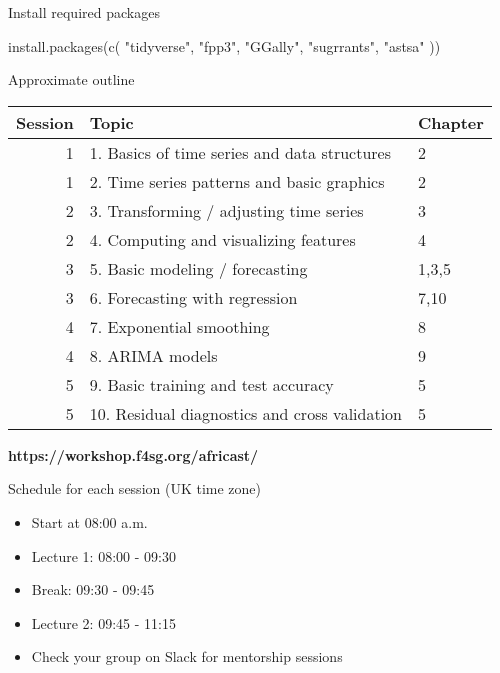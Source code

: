 \documentclass[
  14pt,
  ignorenonframetext,
  aspectratio=169,
]{beamer}
\newenvironment{Shaded}{\begin{snugshade}}{\end{snugshade}}
\newcommand{\FunctionTok}[1]{\textcolor[rgb]{0.00,0.00,0.00}{#1}}
\newcommand{\NormalTok}[1]{\textcolor[rgb]{0.00,0.00,0.00}{#1}}
\newcommand{\StringTok}[1]{\textcolor[rgb]{0.31,0.60,0.02}{#1}}
\providecommand{\tightlist}{%
  \setlength{\itemsep}{0pt}\setlength{\parskip}{0pt}}\usepackage{longtable,booktabs,array}
\renewenvironment{Shaded}{\vspace*{0.15cm}\color{black}\fontsize{10}{10}\sf\begin{snugshade}\color{black}}{\end{snugshade}}
\begin{document}
\begin{frame}[fragile]{Install required packages}
\protect\hypertarget{install-required-packages}{}
\begin{Shaded}
\begin{Highlighting}[]
\FunctionTok{install.packages}\NormalTok{(}\FunctionTok{c}\NormalTok{(}
  \StringTok{"tidyverse"}\NormalTok{,}
  \StringTok{"fpp3"}\NormalTok{,}
  \StringTok{"GGally"}\NormalTok{,}
  \StringTok{"sugrrants"}\NormalTok{,}
  \StringTok{"astsa"}
\NormalTok{))}
\end{Highlighting}
\end{Shaded}
\end{frame}

\begin{frame}{Approximate outline}
\protect\hypertarget{approximate-outline}{}
\vspace*{-0.1cm}\centering\fontsize{12}{12}\sf
\begin{tabular}{rp{8.6cm}l}
  \bf Session & \bf Topic                   & \bf Chapter \\
  \midrule
  1       & 1. Basics of time series and data structures    & 2 \\
  1       & 2. Time series patterns and basic graphics      & 2 \\
  2       & 3. Transforming / adjusting time series         & 3 \\
  2       & 4. Computing and visualizing features     & 4 \\
  3       & 5. Basic modeling / forecasting & 1,3,5 \\
  3       & 6. Forecasting with regression         & 7,10 \\
  4       & 7. Exponential smoothing       & 8 \\
  4       & 8. ARIMA models                & 9 \\
  5       & 9. Basic training and test accuracy       & 5 \\
  5       & 10. Residual diagnostics and cross validation                & 5 \\
  \bottomrule
\end{tabular}

\vspace*{.0cm}\begin{alertblock}{}{\centerline{\Large\textbf{https://workshop.f4sg.org/africast/}}}
\end{alertblock}
\end{frame}

\begin{frame}{Schedule for each session (UK time zone)}
\protect\hypertarget{schedule-for-each-session-uk-time-zone}{}
\begin{itemize}
\tightlist
\item
  Start at 08:00 a.m.
\item
  Lecture 1: 08:00 - 09:30
\item
  Break: 09:30 - 09:45
\item
  Lecture 2: 09:45 - 11:15
\item
  Check your group on Slack for mentorship sessions
\end{itemize}
\end{frame}
\end{document}
